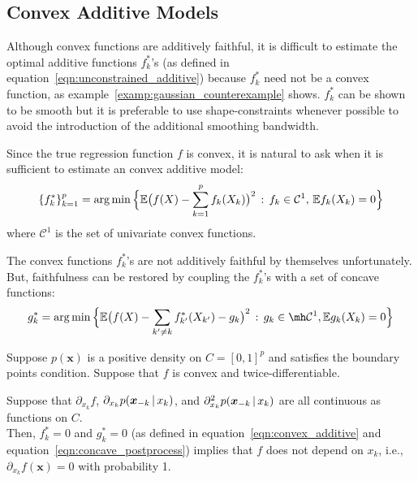 \subsection{Convex Additive Models}

Although convex functions are additively faithful, it is difficult to estimate the optimal additive functions $f^*_k$'s (as defined in equation~\ref{eqn:unconstrained_additive}) because $f^*_k$ need not be a convex function, as example~\ref{examp:gaussian_counterexample} shows. $f^*_k$ can be shown to be smooth but it is preferable to use shape-constraints whenever possible to avoid the introduction of the additional smoothing bandwidth.

Since the true regression function $f$ is convex, it is natural to ask when it is sufficient to estimate an convex additive model:
\begin{equation}
\label{eqn:convex_additive}
\{ f^*_k \}_{k=1}^p = \arg\min \Big \{ 
    {\mathbb E}\big( f(X) - \sum_{k=1}^p f_k(X_k) \big)^2 \,:\, f_k \in \mathcal{C}^1, \, {\mathbb E} f_k(X_k) = 0 \Big \}
\end{equation}
where $\mathcal{C}^1$ is the set of univariate convex functions.

The convex functions $f^*_k$'s are not additively faithful by themselves unfortunately. But, faithfulness can be restored by coupling the $f^*_k$'s with a set of concave functions:
\begin{equation}
\label{eqn:concave_postprocess}
g^*_k = \arg\min \Big\{
   \E\big( f(X) - \sum_{k' \neq k} f^*_{k'}(X_{k'}) - g_k \big)^2 
    \,:\, g_k \in \mh \mathcal{C}^1, \E g_k(X_k) = 0 
  \Big\}
\end{equation}

\begin{theorem}
\label{thm:acdc_faithful}
Suppose $p(\mathbf{x})$ is a positive density on $C=[0,1]^p$ and satisfies the boundary points condition. Suppose that $f$ is convex and twice-differentiable.

Suppose that $\partial_{x_k} f$, $\partial_{x_k} p( \mbox{\boldmath $x$}_{-k} {\,|\,} x_k )$, and $\partial_{x_k}^2 p( \mbox{\boldmath $x$}_{-k} {\,|\,} x_k)$ are all continuous as functions on $C$.\\

Then, $f^*_k = 0$ and $g^*_k = 0$ (as defined in equation~\ref{eqn:convex_additive} and equation~\ref{eqn:concave_postprocess}) implies that $f$ does not depend on $x_k$, i.e., $\partial_{x_k} f(\mathbf{x}) = 0$ with probability 1.
\end{theorem}

